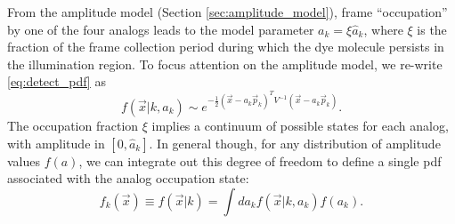 \documentclass[10pt]{article}
\newcommand{\half}{\frac{1}{2}}
\newcommand{\crf}{{\small CRF}}
\begin{document}
From the amplitude model (Section \ref{sec:amplitude_model}), frame ``occupation'' by one of the four analogs leads to the model parameter $a_k = \xi \hat{a}_k$, where $\xi$ is the fraction of the frame collection period during which the dye molecule persists in the illumination region.  
To focus attention on the amplitude model, we re-write \eqref{eq:detect_pdf} as
\begin{equation}
\label{eq:detect_pdf_2}
f(\vec{x}|k,a_k) \sim e^{-\half(\vec{x}-a_k\vec{p}_k)^T V^{-1} (\vec{x}-a_k\vec{p}_k)}.
\end{equation}
The occupation fraction $\xi$ implies a continuum of possible states for each analog, with amplitude in $[0,\hat{a}_k]$.
In general though, for any distribution of amplitude values $f(a)$, we can integrate out this degree of freedom to define a single pdf associated with the analog occupation state:
\begin{equation}
f_k(\vec{x}) \equiv f(\vec{x}|k) = \int{da_k f(\vec{x}|k,a_k) f(a_k)}. \label{eq:detect_pdf_3}
\end{equation}

\end{document}

